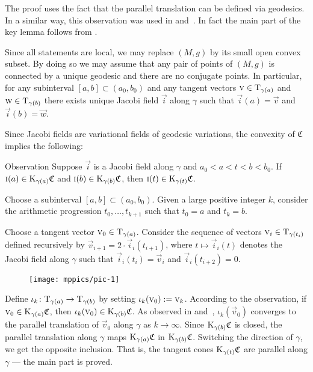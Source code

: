 \documentclass[a4paper,10pt]{article}
\begin{document}
The proof uses the fact that the parallel translation can be defined via geodesics.
In a similar way, this observation was used in \cite[Section 13]{Ber-Nik} and~\cite{Petruninpar}.
In fact the main part of the key lemma follows from
\cite{Petruninpar}.

Since all statements are local, we may replace $(M,g)$ by its small open convex subset.
By doing so we may assume that any pair of points of $(M,g)$ is connected by a unique geodesic and there are no conjugate points.
In particular, for any subinterval $[a,b]\subset (a_0,b_0)$ and any tangent vectors $\text{\sc{v}} \in \mathrm{T}_{\gamma (a)}$ and $\text{\sc{w}} \in \mathrm{T}_{\gamma (b)}$ there exists unique Jacobi field $\vec i$ along $\gamma$ 
such that $\vec i(a)=\vec{v}$ and~$\vec i(b)=\vec{w}$.

Since Jacobi fields are variational fields of geodesic variations, 
the convexity of $\mathfrak{C}$ implies the following: 

\begin{thm}{Observation}
Suppose $\vec i$ is a Jacobi field along %
$\gamma$ and $a_0<a<t<b<b_0$.
If 
$\text{\sc{i}}(a)\in \mathrm{K}_{\gamma(a)}\mathfrak{C}$ and $\text{\sc{i}}(b)\in \mathrm{K}_{\gamma(b)}\mathfrak{C}$,
then $\text{\sc{i}}(t)\in \mathrm{K}_{\gamma(t)}\mathfrak{C}$.
\end{thm}

Choose a subinterval $[a,b] \subset (a_0,b_0)$.
Given a large positive integer $k$, consider the arithmetic progression
$t_0,\dots,t_{k+1}$ such that $t_0=a$ and $t_k=b$.

Choose a tangent vector $\text{\sc{v}}_0\in\mathrm{T}_{\gamma(a)}$.
Consider the sequence of vectors $\vec{v}_i\z\in\T_{\gamma(t_i)}$ defined recursively by $\vec{v}_{i+1}=2\cdot \vec i_i(t_{i+1})$, where $t\mapsto \vec i_i(t)$ denotes the Jacobi field along $\gamma$ such that $\vec i_i(t_i)=\vec{v}_i$ and $\vec i_i(t_{i+2})=0$.

\begin{figure}[ht!]\vskip-0mm\centering\texttt{[image: mppics/pic-1]}\end{figure}

Define $\iota_k\colon\mathrm{T}_{\gamma(a)}\to \mathrm{T}_{\gamma(b)}$ by setting $\iota_k(\text{\sc{v}}_0)\mathrel{{:}{=}} \text{\sc{v}}_k$.
According to the observation, if $\text{\sc{v}}_0\in \mathrm{K}_{\gamma(a)}\mathfrak{C}$, then $\iota_k(\text{\sc{v}}_0)\in \mathrm{K}_{\gamma(b)}\mathfrak{C}$.
As observed in \cite{Ber-Nik} and~\cite{Petruninpar}, $\iota_k(\vec v_0)$ converges to the parallel translation of $\vec v_0$ along $\gamma$ as $k\to \infty$.
Since $\mathrm{K}_{\gamma(b)}\mathfrak{C}$ is closed,
the parallel translation along $\gamma$ maps $\mathrm{K}_{\gamma(a)}\mathfrak{C}$ in $\mathrm{K}_{\gamma(b)}\mathfrak{C}$.
Switching the direction of $\gamma$, we get the opposite inclusion.
That is, the tangent cones $\mathrm{K}_{\gamma(t)}\mathfrak{C}$ are parallel along $\gamma$ --- the main part is proved.
\end{document}

